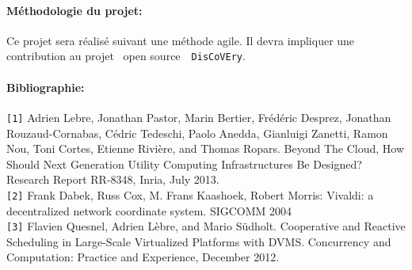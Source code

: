\documentclass[a4paper,11pt]{article}
\newcommand{\discovery}{\texttt{DisCoVEry}\xspace}
\begin{document}
\begin{note}
\paragraph*{Méthodologie du projet:\\}
Ce projet sera réalisé suivant une méthode agile. Il devra impliquer une
contribution au projet \og~open source~\fg\ \discovery.


\paragraph*{Bibliographie:\\}
%
\texttt{[1]} Adrien Lebre, Jonathan Pastor, Marin Bertier, Frédéric Desprez, Jonathan Rouzaud-Cornabas, Cédric Tedeschi, Paolo Anedda, Gianluigi Zanetti, Ramon Nou, Toni Cortes, Etienne Rivière, and Thomas Ropars. Beyond The Cloud, How Should Next Generation Utility Computing Infrastructures Be Designed? Research Report RR-8348, Inria, July 2013.\\
\texttt{[2]} Frank Dabek, Russ Cox, M. Frans Kaashoek, Robert Morris: Vivaldi: a decentralized network coordinate system. SIGCOMM 2004\\
\texttt{[3]} Flavien Quesnel, Adrien Lèbre, and Mario Südholt. Cooperative and Reactive Scheduling in Large-Scale Virtualized Platforms with DVMS. Concurrency and Computation: Practice and Experience, December 2012. 

\end{note}
\end{document}
